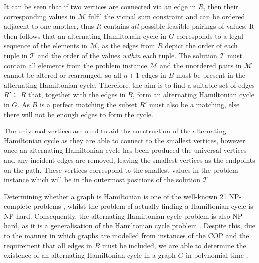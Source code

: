 \documentclass{elsarticle}
\begin{document}
\noindent It can be seen that if two vertices are connected via an edge in $R$, then their corresponding values in $\mathcal{M}$ fulfil the vicinal sum constraint and can be ordered adjacent to one another, thus $R$ contains \emph{all} possible feasible pairings of values. It then follows that an alternating Hamiltonain cycle in $G$ corresponds to a legal sequence of the elements in $\mathcal{M}$, as the edges from $R$ depict the order of each tuple in $\mathcal{T}$ and the order of the values \emph{within} each tuple. The solution $\mathcal{T}$ must contain all elements from the problem instance $\mathcal{M}$ and the unordered pairs in $\mathcal{M}$ cannot be altered or rearranged, so all $n+1$ edges in $B$ must be present in the alternating Hamiltonian cycle. Therefore, the aim is to find a suitable set of edges $R' \subseteq R$ that, together with the edges in $B$, form an alternating Hamiltonian cycle in $G$. As $B$ is a perfect matching the subset $R'$ must also be a matching, else there will not be enough edges to form the cycle.

The universal vertices are used to aid the construction of the alternating Hamiltonian cycle as they are able to connect to the smallest vertices, however once an alternating Hamiltonian cycle has been produced the universal vertices and any incident edges are removed, leaving the smallest vertices as the endpoints on the path. These vertices correspond to the smallest values in the problem instance which will be in the outermost positions of the solution $\mathcal{T}$.

Determining whether a graph is Hamiltonian is one of the well-known 21 NP-complete problems \cite{karp1972}, whilst the problem of actually finding a Hamiltonian cycle is NP-hard. Consequently, the alternating Hamiltonian cycle problem is also NP-hard, as it is a generalisation of the Hamiltonian cycle problem \cite{haggkvist1977}. Despite this, due to the manner in which graphs are modelled from instances of the COP and the requirement that all edges in $B$ must be included, we are able to determine the existence of an alternating Hamiltonian cycle in a graph $G$ in polynomial time \cite{hawa2018}.
\end{document}
